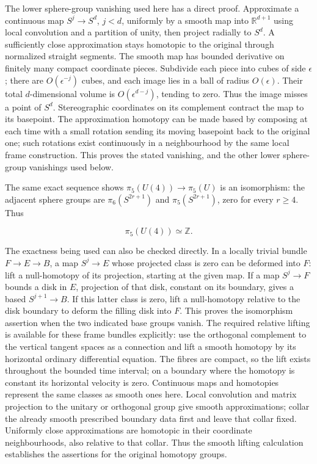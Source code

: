 The lower sphere-group vanishing used here has a direct proof. Approximate a continuous map \(S^j\to S^d\), \(j<d\), uniformly by a smooth map into \(\mathbb R^{d+1}\) using local convolution and a partition of unity, then project radially to \(S^d\). A sufficiently close approximation stays homotopic to the original through normalized straight segments. The smooth map has bounded derivative on finitely many compact coordinate pieces. Subdivide each piece into cubes of side \(\epsilon\); there are \(O(\epsilon^{-j})\) cubes, and each image lies in a ball of radius \(O(\epsilon)\). Their total \(d\)-dimensional volume is \(O(\epsilon^{d-j})\), tending to zero. Thus the image misses a point of \(S^d\). Stereographic coordinates on its complement contract the map to its basepoint. The approximation homotopy can be made based by composing at each time with a small rotation sending its moving basepoint back to the original one; such rotations exist continuously in a neighbourhood by the same local frame construction. This proves the stated vanishing, and the other lower sphere-group vanishings used below.

The same exact sequence shows \(\pi_5(U(4))\to\pi_5(U)\) is an isomorphism: the adjacent sphere groups are \(\pi_6(S^{2r+1})\) and \(\pi_5(S^{2r+1})\), zero for every \(r\geq4\). Thus

\begin{equation}
\pi_5(U(4))\simeq\mathbb Z.
\label{courseIII:spin-six-and-the-framing-comparison:eq:2.7}
\end{equation}

The exactness being used can also be checked directly. In a locally trivial bundle \(F\to E\to B\), a map \(S^j\to E\) whose projected class is zero can be deformed into \(F\): lift a null-homotopy of its projection, starting at the given map. If a map \(S^j\to F\) bounds a disk in \(E\), projection of that disk, constant on its boundary, gives a based \(S^{j+1}\to B\). If this latter class is zero, lift a null-homotopy relative to the disk boundary to deform the filling disk into \(F\). This proves the isomorphism assertion when the two indicated base groups vanish. The required relative lifting is available for these frame bundles explicitly: use the orthogonal complement to the vertical tangent spaces as a connection and lift a smooth homotopy by its horizontal ordinary differential equation. The fibres are compact, so the lift exists throughout the bounded time interval; on a boundary where the homotopy is constant its horizontal velocity is zero. Continuous maps and homotopies represent the same classes as smooth ones here. Local convolution and matrix projection to the unitary or orthogonal group give smooth approximations; collar the already smooth prescribed boundary data first and leave that collar fixed. Uniformly close approximations are homotopic in their coordinate neighbourhoods, also relative to that collar. Thus the smooth lifting calculation establishes the assertions for the original homotopy groups.

